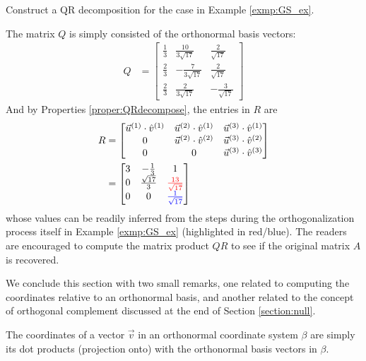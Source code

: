\begin{exmp}
\label{exmp:QRdecom}
Construct a QR decomposition for the case in Example \ref{exmp:GS_ex}.
\end{exmp}
\begin{solution}
The matrix $Q$ is simply consisted of the orthonormal basis vectors:
\begin{align*}
Q &= 
\begin{bmatrix}
\frac{1}{3} & \frac{10}{3\sqrt{17}} & \frac{2}{\sqrt{17}} \\
\frac{2}{3} & -\frac{7}{3\sqrt{17}} & \frac{2}{\sqrt{17}} \\
\frac{2}{3} & \frac{2}{3\sqrt{17}} & -\frac{3}{\sqrt{17}}
\end{bmatrix}
\end{align*}
And by Properties \ref{proper:QRdecompose}, the entries in $R$ are
\begin{align*}
R &= 
\begin{bmatrix}
\vec{u}^{(1)} \cdot \hat{v}^{(1)} & \vec{u}^{(2)} \cdot \hat{v}^{(1)} & \vec{u}^{(3)} \cdot \hat{v}^{(1)} \\
0 & \vec{u}^{(2)} \cdot \hat{v}^{(2)} & \vec{u}^{(3)} \cdot \hat{v}^{(2)} \\
0 & 0 & \vec{u}^{(3)} \cdot \hat{v}^{(3)}
\end{bmatrix}  \\
&= 
\begin{bmatrix}
3 & -\frac{1}{3} & 1 \\
0 & \frac{\sqrt{17}}{3} & \textcolor{red}{\frac{13}{\sqrt{17}}}  \\
0 & 0 & \textcolor{blue}{\frac{1}{\sqrt{17}}} \\
\end{bmatrix} 
\end{align*}
whose values can be readily inferred from the steps during the orthogonalization process itself in Example \ref{exmp:GS_ex} (highlighted in red/blue). The readers are encouraged to compute the matrix product $QR$ to see if the original matrix $A$ is recovered.
\end{solution}
We conclude this section with two small remarks, one related to computing the coordinates relative to an orthonormal basis, and another related to the concept of orthogonal complement discussed at the end of Section \ref{section:null}.
\begin{proper}
\label{proper:orthocoords}
The coordinates of a vector $\vec{v}$ in an orthonormal coordinate system $\beta$ are simply its dot products (projection onto) with the orthonormal basis vectors in $\beta$.
\end{proper}
